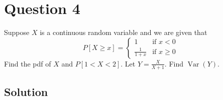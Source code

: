 \section*{Question 4}

Suppose \( X \) is a continuous random variable and we are given that
\begin{equation*}
    P[X \geq x] =
    \begin{cases}
        1             & \text{if } x < 0    \\
        \frac{1}{1+x} & \text{if } x \geq 0
    \end{cases}
\end{equation*}
Find the pdf of \(X\) and \( P[1<X<2] \).
Let \( Y = \frac{X}{X+1} \).
Find \( \operatorname{Var}{(Y)} \).

\subsection*{Solution}
